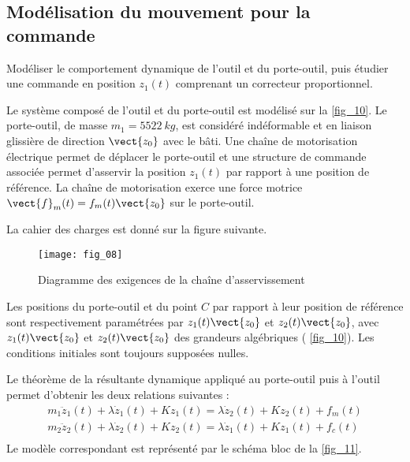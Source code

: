 \ifprof
\else
\begin{multicols}{2}
\fi

\subsection*{Modélisation du mouvement pour la commande}
\ifprof
\else
\begin{obj}
Modéliser le comportement dynamique de l’outil et du porte-outil, puis étudier une commande en
position $z_1(t)$ comprenant un correcteur proportionnel.
\end{obj}

Le système composé de l’outil et du porte-outil est modélisé sur la \autoref{fig_10}. Le porte-outil, de masse $m_1 = \SI{5522}{kg}$,
est considéré indéformable et en liaison glissière de direction $\vect{z_0}$ avec le bâti. Une chaîne de motorisation électrique
permet de déplacer le porte-outil et une structure de commande associée permet d’asservir la position
$z_1(t)$ par rapport à une position de référence. La chaîne de motorisation exerce une force motrice $\vect{f}_m(t) =f_m(t)\vect{z_0}$
sur le porte-outil.

La cahier des charges est donné sur la figure suivante.



\begin{figure}[H]
\centering
\texttt{[image: fig\_08]}
\caption{Diagramme des exigences de la chaîne d'asservissement \label{fig_08}}
\end{figure}




Les positions du porte-outil et du point $C$  par rapport à leur position de référence sont respectivement paramétrées
par $z_1(t)\vect{z_0}$ et $z_2(t)\vect{z_0}$, avec $z_1(t)\vect{z_0}$ et $z_2(t)\vect{z_0}$ des grandeurs algébriques ( \autoref{fig_10}). Les conditions initiales
sont toujours supposées nulles.


Le théorème de la résultante dynamique appliqué au porte-outil puis à l’outil permet d’obtenir les deux relations
suivantes :
$$
\begin{array}{l}
m_1\ddot{z}_1(t)+\lambda\dot{z}_1(t)+Kz_1(t) = \lambda\dot{z}_2(t)+Kz_2(t)+f_m(t) \\
m_2\ddot{z}_2(t)+\lambda\dot{z}_2(t)+Kz_2(t) = \lambda\dot{z}_1(t)+Kz_1(t)+f_c(t) \\
\end{array} $$
Le modèle correspondant est représenté par le schéma bloc de la  \autoref{fig_11}.


\end{multicols}
